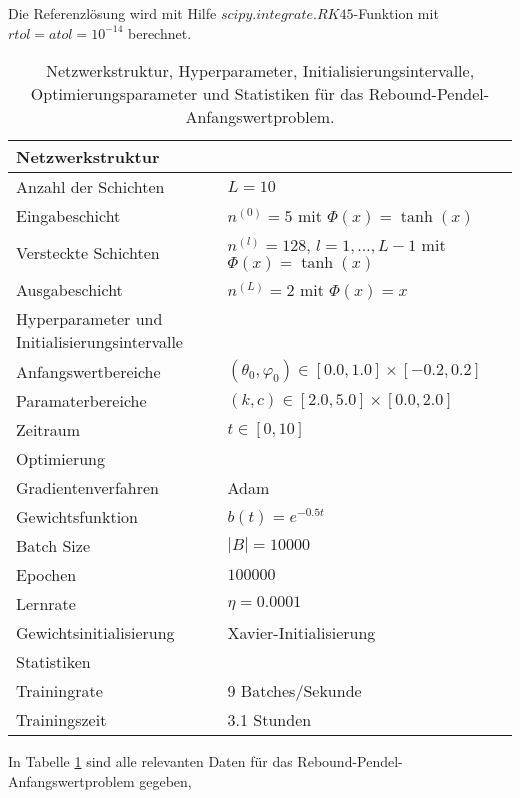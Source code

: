 Die Referenzlösung wird mit Hilfe $scipy.integrate.RK45$-Funktion mit $rtol=atol=10^{-14}$ berechnet.
\begin{table}
       \renewcommand{\arraystretch}{1.0}
       \centering
       \begin{tabular}{ l | l }
              \hline
              Netzwerkstruktur & \\
              \hline
              Anzahl der Schichten & $L=10$ \\
              Eingabeschicht & $n^{(0)}=5$ mit $\Phi(x)=\tanh(x)$ \\
              Versteckte Schichten & $n^{(l)}=128$, $l = 1, \dots, L-1$ mit $\Phi(x)=\tanh(x)$ \\
              Ausgabeschicht & $n^{(L)}=2$ mit $\Phi(x)=x$ \\
              \hline
              Hyperparameter und Initialisierungsintervalle & \\
              \hline
              Anfangswertbereiche & $(\theta_0, \varphi_0) \in [0.0, 1.0] \times [-0.2, 0.2]$ \\
              Paramaterbereiche & $(k, c) \in [2.0, 5.0] \times [0.0, 2.0]$ \\
              Zeitraum & $t \in [0, 10]$ \\
              \hline
              Optimierung & \\
              \hline
              Gradientenverfahren & Adam \\
              Gewichtsfunktion & $b(t)=e^{-0.5t}$ \\
              Batch Size & $|B|=10000$ \\
              Epochen & $100000$ \\
              Lernrate & $\eta= 0.0001$ \\
              Gewichtsinitialisierung & Xavier-Initialisierung \\
              \hline
              Statistiken & \\
              \hline
              Trainingrate & 9 Batches/Sekunde  \\
              Trainingszeit & 3.1 Stunden \\
              \hline
       \end{tabular}
       \caption{Netzwerkstruktur, Hyperparameter, Initialisierungsintervalle, Optimierungsparameter und Statistiken
       für das Rebound-Pendel-Anfangswertproblem.}
\label{rebound-pendulum-table}
\end{table}
In Tabelle \ref{rebound-pendulum-table} sind alle relevanten Daten für das Rebound-Pendel-Anfangswertproblem gegeben,
